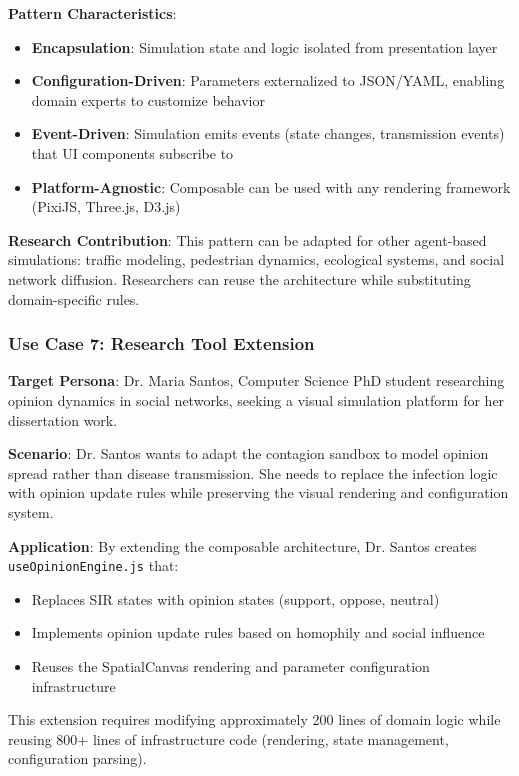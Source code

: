 \textbf{Pattern Characteristics}:
\begin{itemize}
    \item \textbf{Encapsulation}: Simulation state and logic isolated from presentation layer
    \item \textbf{Configuration-Driven}: Parameters externalized to JSON/YAML, enabling domain experts to customize behavior
    \item \textbf{Event-Driven}: Simulation emits events (state changes, transmission events) that UI components subscribe to
    \item \textbf{Platform-Agnostic}: Composable can be used with any rendering framework (PixiJS, Three.js, D3.js)
\end{itemize}

\textbf{Research Contribution}: This pattern can be adapted for other agent-based simulations: traffic modeling, pedestrian dynamics, ecological systems, and social network diffusion. Researchers can reuse the architecture while substituting domain-specific rules.

\subsubsection{Use Case 7: Research Tool Extension}

\textbf{Target Persona}: Dr. Maria Santos, Computer Science PhD student researching opinion dynamics in social networks, seeking a visual simulation platform for her dissertation work.

\textbf{Scenario}: Dr. Santos wants to adapt the contagion sandbox to model opinion spread rather than disease transmission. She needs to replace the infection logic with opinion update rules while preserving the visual rendering and configuration system.

\textbf{Application}: By extending the composable architecture, Dr. Santos creates \texttt{useOpinionEngine.js} that:
\begin{itemize}
    \item Replaces SIR states with opinion states (support, oppose, neutral)
    \item Implements opinion update rules based on homophily and social influence
    \item Reuses the SpatialCanvas rendering and parameter configuration infrastructure
\end{itemize}

This extension requires modifying approximately 200 lines of domain logic while reusing 800+ lines of infrastructure code (rendering, state management, configuration parsing).

